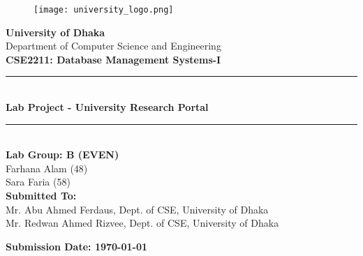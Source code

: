 \documentclass[12pt,a4paper]{article}
\begin{document}
\begin{titlepage}
    \centering
    
    \vspace*{1.5cm}
    \begin{figure}[h]
        \centering
        \texttt{[image: university\_logo.png]}
    \end{figure}
    
    \vspace{0.5cm}
    
    {\LARGE\textbf{University of Dhaka}}\\[0.3cm]
    {\large Department of Computer Science and Engineering}\\[1.5cm]
    
    {\Large\textbf{CSE2211: Database Management Systems-I}}\\[1.5cm]
    
    \rule{\textwidth}{1pt}\\[0.3cm]
    {\large\textbf{Lab Project - University Research Portal}}\\[0.3cm]
    \rule{\textwidth}{1pt}\\[2cm]
    
    {\large\textbf{Lab Group: B (EVEN)}}\\[1cm]
    
    Farhana Alam (48)\\
    Sara Faria (58)\\[2cm]
    
    {\large\textbf{Submitted To:}}\\[0.5cm]
    Mr. Abu Ahmed Ferdaus, Dept. of CSE, University of Dhaka\\
    Mr. Redwan Ahmed Rizvee, Dept. of CSE, University of Dhaka\\[2cm]
    
    \vfill
    
    {\large\textbf{Submission Date: \today}}
    
\end{titlepage}

\tableofcontents
\newpage

\listoffigures
\newpage
\end{document}
